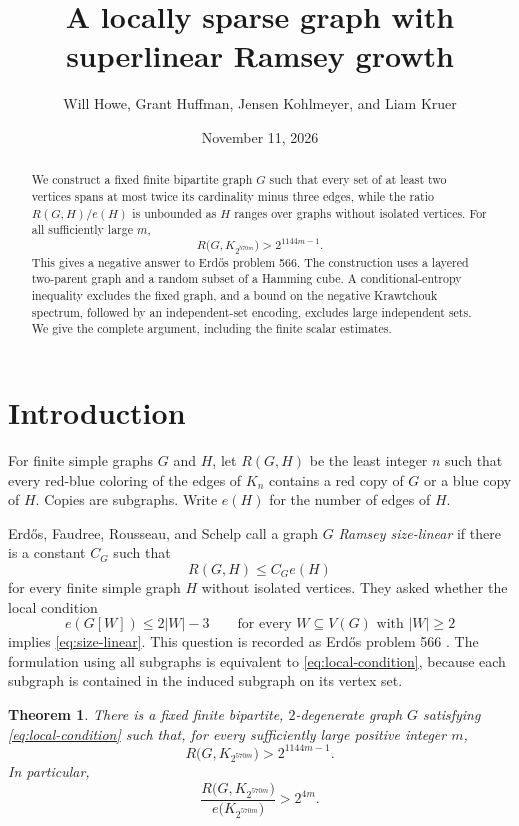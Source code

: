 \documentclass[11pt,leqno]{amsart}
\title[Locally sparse graphs and Ramsey growth]{A locally sparse graph with superlinear Ramsey growth}
\author[Howe, Huffman, Kohlmeyer, and Kruer]{Will Howe, Grant Huffman, Jensen Kohlmeyer, and Liam Kruer}
\date{November 11, 2026}
\numberwithin{equation}{section}
\newtheorem{theorem}{Theorem}[section]
\theoremstyle{definition}
\theoremstyle{remark}
\newcommand{\abs}[1]{\lvert#1\rvert}
\begin{document}
\begin{abstract}
We construct a fixed finite bipartite graph $G$ such that every set of at least two vertices spans at most twice its cardinality minus three edges, while the ratio $R(G,H)/e(H)$ is unbounded as $H$ ranges over graphs without isolated vertices. For all sufficiently large $m$,
\[
  R\bigl(G,K_{2^{570m}}\bigr)>2^{1144m-1}.
\]
This gives a negative answer to Erd\H{o}s problem 566. The construction uses a layered two-parent graph and a random subset of a Hamming cube. A conditional-entropy inequality excludes the fixed graph, and a bound on the negative Krawtchouk spectrum, followed by an independent-set encoding, excludes large independent sets. We give the complete argument, including the finite scalar estimates.
\end{abstract}
\maketitle

\section{Introduction}

For finite simple graphs $G$ and $H$, let $R(G,H)$ be the least integer $n$ such that every red-blue coloring of the edges of $K_n$ contains a red copy of $G$ or a blue copy of $H$. Copies are subgraphs. Write $e(H)$ for the number of edges of $H$.

Erd\H{o}s, Faudree, Rousseau, and Schelp \cite{EFRS} call a graph $G$ \emph{Ramsey size-linear} if there is a constant $C_G$ such that
\begin{equation}\label{eq:size-linear}
  R(G,H)\le C_G e(H)
\end{equation}
for every finite simple graph $H$ without isolated vertices. They asked whether the local condition
\begin{equation}\label{eq:local-condition}
  e(G[W])\le 2\abs{W}-3
  \qquad\text{for every }W\subseteq V(G)\text{ with }\abs{W}\ge2
\end{equation}
implies \eqref{eq:size-linear}. This question is recorded as Erd\H{o}s problem 566 \cite{Bloom}. The formulation using all subgraphs is equivalent to \eqref{eq:local-condition}, because each subgraph is contained in the induced subgraph on its vertex set.

\begin{theorem}\label{thm:main}
There is a fixed finite bipartite, $2$-degenerate graph $G$ satisfying \eqref{eq:local-condition} such that, for every sufficiently large positive integer $m$,
\begin{equation}\label{eq:main-bound}
 R\bigl(G,K_{2^{570m}}\bigr)>2^{1144m-1}.
\end{equation}
In particular,
\begin{equation}\label{eq:main-ratio}
 \frac{R\bigl(G,K_{2^{570m}}\bigr)}{e\bigl(K_{2^{570m}}\bigr)}>2^{4m}.
\end{equation}
\end{theorem}
\end{document}
